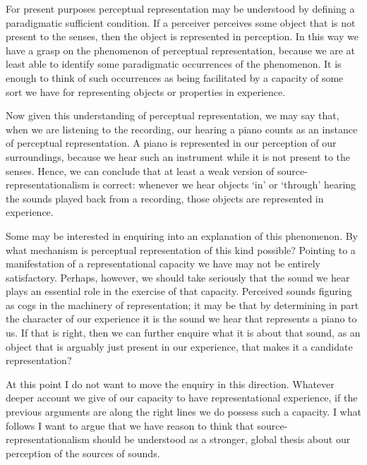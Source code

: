 \documentclass[sloppy, journal, git, bytitle, dodraft]{humapap}
\begin{document}
\sect For present purposes perceptual representation may be understood by defining a paradigmatic sufficient condition. If a perceiver perceives some object that is not present to the senses, then the object is represented in perception. In this way we have a grasp on the phenomenon of perceptual representation, because we are at least able to identify some paradigmatic occurrences of the phenomenon. It is enough to think of such occurrences as being facilitated by a capacity of some sort we have for representing objects or properties in experience. 

Now given this understanding of perceptual representation, we may say that, when we are listening to the recording, our hearing a piano counts as an instance of perceptual representation. A piano is represented in our perception of our surroundings, because we hear such an instrument while it is not present to the senses. Hence, we can conclude that at least a weak version of source-representationalism is correct: whenever we hear objects `in' or `through' hearing the sounds played back from a recording, those objects are  represented in experience. 

Some may be interested in enquiring into an explanation of this phenomenon. By what mechanism is perceptual representation of this kind possible? Pointing to a manifestation of a representational capacity we have may not be entirely satisfactory. Perhaps, however, we should take seriously that the sound we hear plays an essential role in the exercise of that capacity. Perceived sounds figuring as cogs in the machinery of representation; it may be that by determining in part the character of our experience it is the sound we hear that represents a piano to us. If that is right, then we can further enquire what it is about that sound, as an object that is arguably just present in our experience, that makes it a candidate representation? 

At this point I do not want to move the enquiry in this direction. Whatever deeper account we give of our capacity to have representational experience, if the previous arguments are along the right lines we do possess such a capacity. I what follows I want to argue that we have reason to think that source-representationalism should be understood as a stronger, global thesis about our perception of the sources of sounds. 
\end{document}
